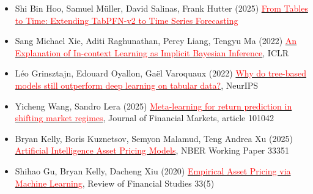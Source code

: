 \documentclass[11pt]{article}
\begin{document}
\begin{itemize}
\begin{itemize}
\begin{itemize}
        \item Shi Bin Hoo, Samuel M\"uller, David Salinas, Frank Hutter (2025) \href{https://arxiv.org/abs/2501.02945}{\textcolor{red}{From Tables to Time: Extending TabPFN-v2 to Time Series Forecasting}}
        \item Sang Michael Xie, Aditi Raghunathan, Percy Liang, Tengyu Ma (2022) \href{https://arxiv.org/abs/2111.02080}{\textcolor{red}{An Explanation of In-context Learning as Implicit Bayesian Inference}}, ICLR
        \item L\'eo Grinsztajn, Edouard Oyallon, Ga\"el Varoquaux (2022) \href{https://arxiv.org/abs/2207.08815}{\textcolor{red}{Why do tree-based models still outperform deep learning on tabular data?}}, NeurIPS
        \item Yicheng Wang, Sandro Lera (2025) \href{https://doi.org/10.1016/j.finmar.2025.101042}{\textcolor{red}{Meta-learning for return prediction in shifting market regimes}}, Journal of Financial Markets, article 101042
        \item Bryan Kelly, Boris Kuznetsov, Semyon Malamud, Teng Andrea Xu (2025) \href{https://www.nber.org/papers/w33351}{\textcolor{red}{Artificial Intelligence Asset Pricing Models}}, NBER Working Paper 33351
        \item Shihao Gu, Bryan Kelly, Dacheng Xiu (2020) \href{https://doi.org/10.1093/rfs/hhaa009}{\textcolor{red}{Empirical Asset Pricing via Machine Learning}}, Review of Financial Studies 33(5)
      \end{itemize}
  \end{itemize}


\end{itemize}
\end{document}
